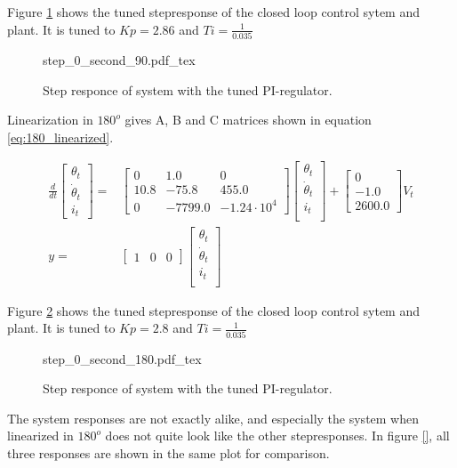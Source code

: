 \documentclass[../../../Main]{subfiles}
\begin{document}
Figure \ref{fig:step_0_second_90} shows the tuned stepresponse of the closed loop control sytem and plant.
It is tuned to $Kp = 2.86$ and $Ti = \frac{1}{0.035}$
\begin{figure}[H]
\centering
\def\svgwidth{\textwidth}
{step_0_second_90.pdf_tex}
\caption{Step responce of system with the tuned PI-regulator.}
\label{fig:step_0_second_90}
\end{figure}


Linearization in $180^o$ gives A, B and C matrices shown in equation \ref{eq:180_linearized}. 

\begin{equation}
      \label{eq:180_linearized}
      \begin{split}
      \frac{d}{dt}
    \begin{bmatrix}
        \theta_t \\
        \dot \theta_t \\
        i_t
    \end{bmatrix}
    =&
    \begin{bmatrix} 0 & 1.0 & 0\\ 10.8 & -75.8 & 455.0\\ 0 & -7799.0 & -1.24\cdot10^4 \end{bmatrix}
    \begin{bmatrix}
        \theta_t \\
        \dot \theta_t \\
        i_t \\
    \end{bmatrix}
    +
    \begin{bmatrix}
    0\\ -1.0\\ 2600.0
    \end{bmatrix}
    V_t
\\
      y =&
    \begin{bmatrix}
        1 & 0 & 0
    \end{bmatrix}
    \begin{bmatrix}
        \theta_t \\
        \dot \theta_t\\
        i_t\\
    \end{bmatrix}
    \end{split}
\end{equation}


Figure \ref{fig:step_0_second_180} shows the tuned stepresponse of the closed loop control sytem and plant.
It is tuned to $Kp = 2.8$ and $Ti = \frac{1}{0.035}$
\begin{figure}[H]
\centering
\def\svgwidth{\textwidth}
{step_0_second_180.pdf_tex}
\caption{Step responce of system with the tuned PI-regulator.}
\label{fig:step_0_second_180}
\end{figure}

The system responses are not exactly alike, and especially the system when linearized in $180^o$ does not quite look like the other stepresponses. In figure \ref{}, all three responses are shown in the same plot for comparison.
\end{document}
